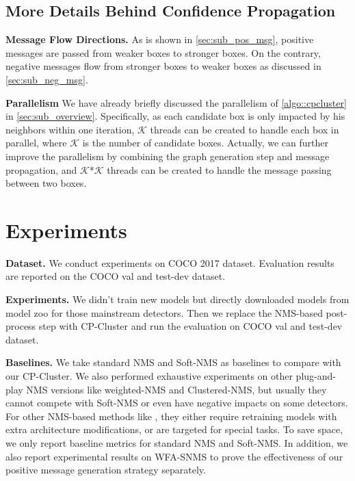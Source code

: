 \documentclass[10pt,twocolumn,letterpaper]{article}
\begin{document}
\subsection{More Details Behind Confidence Propagation}
\textbf{Message Flow Directions.} As is shown in \cref{sec:sub_pos_msg}, positive messages are passed from weaker boxes to stronger boxes. On the contrary, negative messages flow from stronger boxes to weaker boxes as discussed in \cref{sec:sub_neg_msg}.

\textbf{Parallelism} We have already briefly discussed the parallelism of \cref{algo::cpcluster} in \cref{sec:sub_overview}. Specifically, as each candidate box is only impacted by his neighbors within one iteration, $\mathcal{K}$ threads can be created to handle each box in parallel, where $\mathcal{K}$ is the number of candidate boxes.
Actually, we can further improve the parallelism by combining the graph generation step and message propagation, and $\mathcal{K}$*$\mathcal{K}$ threads can be created to handle the message passing between two boxes.

\section{Experiments}
\label{sec:exp}
\textbf{Dataset.} We conduct experiments on COCO 2017 dataset\cite{lin2014microsoft}. Evaluation results are reported on the COCO val and test-dev dataset.

\textbf{Experiments.} We didn't train new models but directly downloaded models from model zoo for those mainstream detectors.
Then we replace the NMS-based post-process step with CP-Cluster and run the evaluation on COCO val and test-dev dataset.

\textbf{Baselines.} We take standard NMS and Soft-NMS as baselines to compare with our CP-Cluster.
We also performed exhaustive experiments on other plug-and-play NMS versions like weighted-NMS\cite{zhou2017cad} and Clustered-NMS\cite{zheng2021enhancing}, but usually they cannot compete with Soft-NMS or even have negative impacts on some detectors.
For other NMS-based methods like \cite{liu2019adaptive,he2019bounding,learnnms}, they either require retraining models with extra architecture modifications, or are targeted for special tasks.
To save space, we only report baseline metrics for standard NMS and Soft-NMS. In addition, we also report experimental results on WFA-SNMS to prove the effectiveness of our positive message generation strategy separately.
\end{document}
